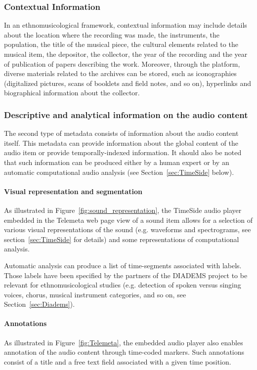 \documentclass{sig-alternate}
\newcommand{\squeezeup}{\vspace{-2.5mm}}
\begin{document}
\subsubsection{Contextual Information}
In an ethnomusicological framework, contextual information may include details about the location where the recording was made, the instruments, the population, the title of the musical piece, the cultural elements related to the musical item, the depositor, the collector, the year of the recording and the year of publication of papers describing the work. 
Moreover, through the platform, diverse materials related to the archives can be stored, such as iconographies (digitalized pictures, scans of booklets and field notes, and so on), hyperlinks and biographical information about the collector. 

\subsubsection{Descriptive and analytical information on the audio content}
The second type of metadata consists of information about the audio content itself. This metadata can provide information about the global content of the audio item or provide temporally-indexed information. It should also be noted that such information can be produced either by a human expert or by an automatic computational audio analysis (see Section~\ref{sec:TimeSide} below).

\squeezeup\paragraph{Visual representation and segmentation}
As illustrated in Figure~\ref{fig:sound_representation}, the TimeSide audio player embedded in the Telemeta web page view of a sound item allows for a selection of various visual representations of the sound (e.g. waveforms and spectrograms, see section~\ref{sec:TimeSide} for details) and some representations of computational analysis.

Automatic analysis can produce a list of time-segments associated with labels.
Those labels have been specified by the partners of the DIADEMS project to be relevant for ethnomusicological studies (e.g. detection of spoken versus singing voices, chorus, musical instrument categories, and so on, see Section~\ref{sec:Diadems}).

\squeezeup\paragraph{Annotations}
As illustrated in Figure~\ref{fig:Telemeta}, the embedded audio player also enables annotation of the audio content through time-coded markers.
Such annotations consist of a title and a free text field associated with a given time position.
\end{document}
